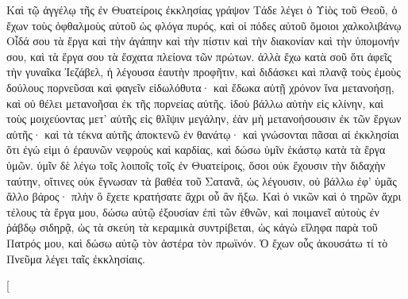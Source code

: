 \begin{pages}
\begin{Rightside}
		\pend
		\pstart
			Καὶ τῷ ἀγγέλῳ τῆς ἐν Θυατείροις ἐκκλησίας γράψον Τάδε λέγει ὁ Υἱὸς τοῦ Θεοῦ, ὁ ἔχων τοὺς ὀφθαλμοὺς αὐτοῦ ὡς φλόγα πυρός, καὶ οἱ πόδες αὐτοῦ ὅμοιοι χαλκολιβάνῳ Οἶδά σου τὰ ἔργα καὶ τὴν ἀγάπην καὶ τὴν πίστιν καὶ τὴν διακονίαν καὶ τὴν ὑπομονήν σου, καὶ τὰ ἔργα σου τὰ ἔσχατα πλείονα τῶν πρώτων. 
		\pend
		\pstart
			ἀλλὰ ἔχω κατὰ σοῦ ὅτι ἀφεῖς τὴν γυναῖκα Ἰεζάβελ, ἡ λέγουσα ἑαυτὴν προφῆτιν, καὶ διδάσκει καὶ πλανᾷ τοὺς ἐμοὺς δούλους πορνεῦσαι καὶ φαγεῖν εἰδωλόθυτα· καὶ ἔδωκα αὐτῇ χρόνον ἵνα μετανοήσῃ, καὶ οὐ θέλει μετανοῆσαι ἐκ τῆς πορνείας αὐτῆς.
		\pend
		\pstart	
			ἰδοὺ βάλλω αὐτὴν εἰς κλίνην, καὶ τοὺς μοιχεύοντας μετ’ αὐτῆς εἰς θλῖψιν μεγάλην, ἐὰν μὴ μετανοήσουσιν ἐκ τῶν ἔργων αὐτῆς· καὶ τὰ τέκνα αὐτῆς ἀποκτενῶ ἐν θανάτῳ· καὶ γνώσονται πᾶσαι αἱ ἐκκλησίαι ὅτι ἐγώ εἰμι ὁ ἐραυνῶν νεφροὺς καὶ καρδίας, καὶ δώσω ὑμῖν ἑκάστῳ κατὰ τὰ ἔργα ὑμῶν. ὑμῖν δὲ λέγω τοῖς λοιποῖς τοῖς ἐν Θυατείροις, ὅσοι οὐκ ἔχουσιν τὴν διδαχὴν ταύτην, οἵτινες οὐκ ἔγνωσαν τὰ βαθέα τοῦ Σατανᾶ, ὡς λέγουσιν, οὐ βάλλω ἐφ’ ὑμᾶς ἄλλο βάρος· πλὴν ὃ ἔχετε κρατήσατε ἄχρι οὗ ἂν ἥξω. Καὶ ὁ νικῶν καὶ ὁ τηρῶν ἄχρι τέλους τὰ ἔργα μου, δώσω αὐτῷ ἐξουσίαν ἐπὶ τῶν ἐθνῶν, καὶ ποιμανεῖ αὐτοὺς ἐν ῥάβδῳ σιδηρᾷ, ὡς τὰ σκεύη τὰ κεραμικὰ συντρίβεται, ὡς κἀγὼ εἴληφα παρὰ τοῦ Πατρός μου, καὶ δώσω αὐτῷ τὸν ἀστέρα τὸν πρωϊνόν. Ὁ ἔχων οὖς ἀκουσάτω τί τὸ Πνεῦμα λέγει ταῖς ἐκκλησίαις.
			\pend
        \endnumbering
    \end{Rightside}
    \begin{Leftside}
        \beginnumbering
        \pstart[

\end{Leftside}
\end{pages}
